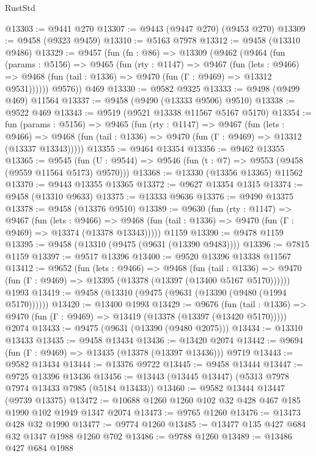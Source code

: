 \begin{lexlean}{RustStd}
\begin{coremodule}
@13303 := @9441 @270
@13307 := @9443 (@9447 @270) (@9453 @270)
@13309 := @9458 (@9323 @9459)
@13310 := @5163 @7978
@13312 := @9458 (@13310 @9486)
@13329 := @9457
    (fun (fn : @86) =>
    @13309
      (@9462
        (@9464
          (fun (params : @5156) =>
          @9465
            (fun (rty : @1147) =>
            @9467
              (fun (lets : @9466) =>
              @9468 (fun (tail : @1336) => @9470 (fun (Γ : @9469) => @13312 @9531))))))
        @9576))
    @469
@13330 := @9582 @9325
@13333 := @9498 (@9499 @469) @11564
@13337 := @9458 (@9490 (@13333 @9506) @9510)
@13338 := @9522 @469
@13343 := @9519 (@9521 @13338 @11567 @5167 @5170)
@13354 := fun (params : @5156) =>
  @9465
    (fun (rty : @1147) =>
    @9467
      (fun (lets : @9466) =>
      @9468 (fun (tail : @1336) => @9470 (fun (Γ : @9469) => @13312 (@13337 @13343)))))
@13355 := @9464 @13354
@13356 := @9462 @13355
@13365 := @9545
    (fun (U : @9544) => @9546 (fun (t : @7) => @9553 (@9458 (@9559 @11564 @5173) @9570)))
@13368 := @13330 (@13356 @13365) @11562
@13370 := @9443 @13355 @13365
@13372 := @9627 @13354 @1315
@13374 := @9458 (@13310 @9633)
@13375 := @13333 @9636
@13376 := @9490 @13375
@13378 := @9458 (@13376 @9510)
@13389 := @9630
    (fun (rty : @1147) =>
    @9467
      (fun (lets : @9466) =>
      @9468 (fun (tail : @1336) => @9470 (fun (Γ : @9469) => @13374 (@13378 @13343)))))
    @1159
@13390 := @9478 @1159
@13395 := @9458 (@13310 (@9475 (@9631 (@13390 @9483))))
@13396 := @7815 @1159
@13397 := @9517 @13396
@13400 := @9520 @13396 @13338 @11567
@13412 := @9652
    (fun (lets : @9466) =>
    @9468
      (fun (tail : @1336) =>
      @9470 (fun (Γ : @9469) => @13395 (@13378 (@13397 (@13400 @5167 @5170))))))
    @1993
@13419 := @9458 (@13310 (@9475 (@9631 (@13390 (@9480 (@1994 @5170))))))
@13420 := @13400 @1993
@13429 := @9676
    (fun (tail : @1336) => @9470 (fun (Γ : @9469) => @13419 (@13378 (@13397 (@13420 @5170)))))
    @2074
@13433 := @9475 (@9631 (@13390 (@9480 @2075)))
@13434 := @13310 @13433
@13435 := @9458 @13434
@13436 := @13420 @2074
@13442 := @9694 (fun (Γ : @9469) => @13435 (@13378 (@13397 @13436))) @9719
@13443 := @9582 @13434
@13444 := @13376 @9722
@13445 := @9458 @13444
@13447 := @9725 @13396 @13436
@13456 := @13443 (@13445 @13447) (@5313 @7978 @7974 @13433 @7985 (@5184 @13433))
@13460 := @9582 @13444 @13447 (@9739 @13375)
@13472 := @10688 @1260 @1260 @102 @32 @428 @467 @185 @1990 @102 @1949 @1347 @2074
@13473 := @9765 @1260
@13476 := @13473 @428 @32 @1990
@13477 := @9774 @1260
@13485 := @13477 @135 @427 @684 @32 @1347 @1988 @1260 @702
@13486 := @9788 @1260
@13489 := @13486 @427 @684 @1988

\end{coremodule}
\end{lexlean}

